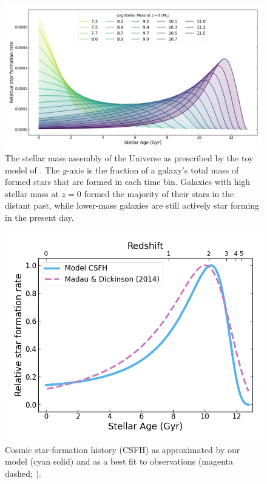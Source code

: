 \documentclass[fleqn,usenatbib]{mnras}
\begin{document}

\begin{figure}
    \centering
    \includegraphics[width=\textwidth]{figs/SFHs_colour.png}
    \caption{The stellar mass assembly of the Universe as prescribed by the toy model of . The $y$-axis is the fraction of a galaxy's total mass of formed stars that are formed in each time bin. Galaxies with high stellar mass at $z=0$ formed the majority of their stars in the distant past, while lower-mass galaxies are still actively star forming in the present day.}
    \label{fig:SFHs}
\end{figure}

\begin{figure}
    \centering
    \includegraphics[width=.5\textwidth]{figs/CSFH_MD14.png}
    \caption{Cosmic star-formation history (CSFH) as approximated by our model (cyan solid) and as a best fit to observations (magenta dashed; \citealt{Madau2014}).}%
    \label{fig:csfh}
\end{figure}

\end{document}
